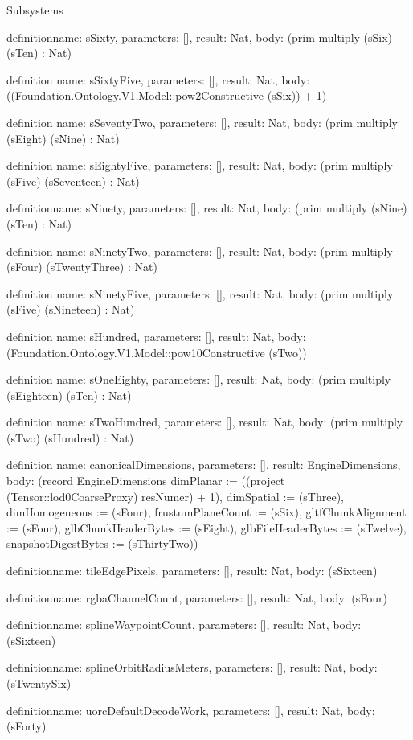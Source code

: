 \begin{lexlean}{Subsystems}
\begin{semanticmodule}
definition{name: sSixty, parameters: [], result: Nat, body: (prim multiply (sSix) (sTen) : Nat)}

definition{
  name: sSixtyFive,
  parameters: [],
  result: Nat,
  body: ((Foundation.Ontology.V1.Model::pow2Constructive (sSix)) + 1)
}

definition{
  name: sSeventyTwo,
  parameters: [],
  result: Nat,
  body: (prim multiply (sEight) (sNine) : Nat)
}

definition{
  name: sEightyFive,
  parameters: [],
  result: Nat,
  body: (prim multiply (sFive) (sSeventeen) : Nat)
}

definition{name: sNinety, parameters: [], result: Nat, body: (prim multiply (sNine) (sTen) : Nat)}

definition{
  name: sNinetyTwo,
  parameters: [],
  result: Nat,
  body: (prim multiply (sFour) (sTwentyThree) : Nat)
}

definition{
  name: sNinetyFive,
  parameters: [],
  result: Nat,
  body: (prim multiply (sFive) (sNineteen) : Nat)
}

definition{
  name: sHundred,
  parameters: [],
  result: Nat,
  body: (Foundation.Ontology.V1.Model::pow10Constructive (sTwo))
}

definition{
  name: sOneEighty,
  parameters: [],
  result: Nat,
  body: (prim multiply (sEighteen) (sTen) : Nat)
}

definition{
  name: sTwoHundred,
  parameters: [],
  result: Nat,
  body: (prim multiply (sTwo) (sHundred) : Nat)
}

definition{
  name: canonicalDimensions,
  parameters: [],
  result: EngineDimensions,
  body: (record EngineDimensions {dimPlanar := ((project (Tensor::lod0CoarseProxy) resNumer) + 1), dimSpatial := (sThree), dimHomogeneous := (sFour), frustumPlaneCount := (sSix), gltfChunkAlignment := (sFour), glbChunkHeaderBytes := (sEight), glbFileHeaderBytes := (sTwelve), snapshotDigestBytes := (sThirtyTwo)})
}

definition{name: tileEdgePixels, parameters: [], result: Nat, body: (sSixteen)}

definition{name: rgbaChannelCount, parameters: [], result: Nat, body: (sFour)}

definition{name: splineWaypointCount, parameters: [], result: Nat, body: (sSixteen)}

definition{name: splineOrbitRadiusMeters, parameters: [], result: Nat, body: (sTwentySix)}

definition{name: uorcDefaultDecodeWork, parameters: [], result: Nat, body: (sForty)}


\end{semanticmodule}
\end{lexlean}
